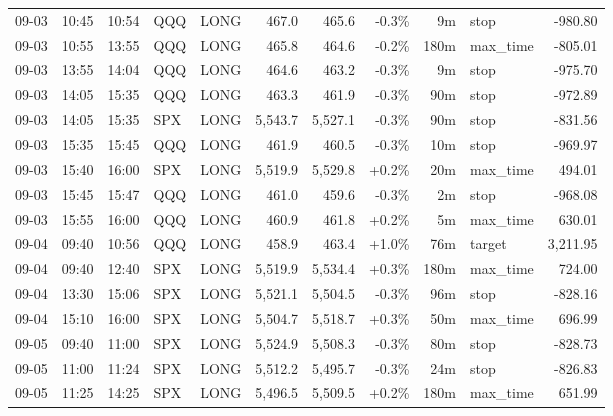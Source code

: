 \documentclass[11pt,a4paper,twoside]{article}
\begin{document}
\begin{center}
\begin{longtable}{>{\color{txtmain}}l l l l l r r r r >{\color{txtmain}}l r}
09-03 & 10:45 & 10:54 & QQQ & LONG & 467.0 & 465.6 & \textcolor{lossred}{-0.3\%} & 9m & stop & \textcolor{lossred}{-980.80} \\
09-03 & 10:55 & 13:55 & QQQ & LONG & 465.8 & 464.6 & \textcolor{lossred}{-0.2\%} & 180m & max\_time & \textcolor{lossred}{-805.01} \\
09-03 & 13:55 & 14:04 & QQQ & LONG & 464.6 & 463.2 & \textcolor{lossred}{-0.3\%} & 9m & stop & \textcolor{lossred}{-975.70} \\
09-03 & 14:05 & 15:35 & QQQ & LONG & 463.3 & 461.9 & \textcolor{lossred}{-0.3\%} & 90m & stop & \textcolor{lossred}{-972.89} \\
09-03 & 14:05 & 15:35 & SPX & LONG & 5,543.7 & 5,527.1 & \textcolor{lossred}{-0.3\%} & 90m & stop & \textcolor{lossred}{-831.56} \\
09-03 & 15:35 & 15:45 & QQQ & LONG & 461.9 & 460.5 & \textcolor{lossred}{-0.3\%} & 10m & stop & \textcolor{lossred}{-969.97} \\
09-03 & 15:40 & 16:00 & SPX & LONG & 5,519.9 & 5,529.8 & \textcolor{wingreen}{+0.2\%} & 20m & max\_time & \textcolor{wingreen}{494.01} \\
09-03 & 15:45 & 15:47 & QQQ & LONG & 461.0 & 459.6 & \textcolor{lossred}{-0.3\%} & 2m & stop & \textcolor{lossred}{-968.08} \\
09-03 & 15:55 & 16:00 & QQQ & LONG & 460.9 & 461.8 & \textcolor{wingreen}{+0.2\%} & 5m & max\_time & \textcolor{wingreen}{630.01} \\
09-04 & 09:40 & 10:56 & QQQ & LONG & 458.9 & 463.4 & \textcolor{wingreen}{+1.0\%} & 76m & target & \textcolor{wingreen}{3,211.95} \\
09-04 & 09:40 & 12:40 & SPX & LONG & 5,519.9 & 5,534.4 & \textcolor{wingreen}{+0.3\%} & 180m & max\_time & \textcolor{wingreen}{724.00} \\
09-04 & 13:30 & 15:06 & SPX & LONG & 5,521.1 & 5,504.5 & \textcolor{lossred}{-0.3\%} & 96m & stop & \textcolor{lossred}{-828.16} \\
09-04 & 15:10 & 16:00 & SPX & LONG & 5,504.7 & 5,518.7 & \textcolor{wingreen}{+0.3\%} & 50m & max\_time & \textcolor{wingreen}{696.99} \\
09-05 & 09:40 & 11:00 & SPX & LONG & 5,524.9 & 5,508.3 & \textcolor{lossred}{-0.3\%} & 80m & stop & \textcolor{lossred}{-828.73} \\
09-05 & 11:00 & 11:24 & SPX & LONG & 5,512.2 & 5,495.7 & \textcolor{lossred}{-0.3\%} & 24m & stop & \textcolor{lossred}{-826.83} \\
09-05 & 11:25 & 14:25 & SPX & LONG & 5,496.5 & 5,509.5 & \textcolor{wingreen}{+0.2\%} & 180m & max\_time & \textcolor{wingreen}{651.99} \\

\end{longtable}
\end{center}
\end{document}
